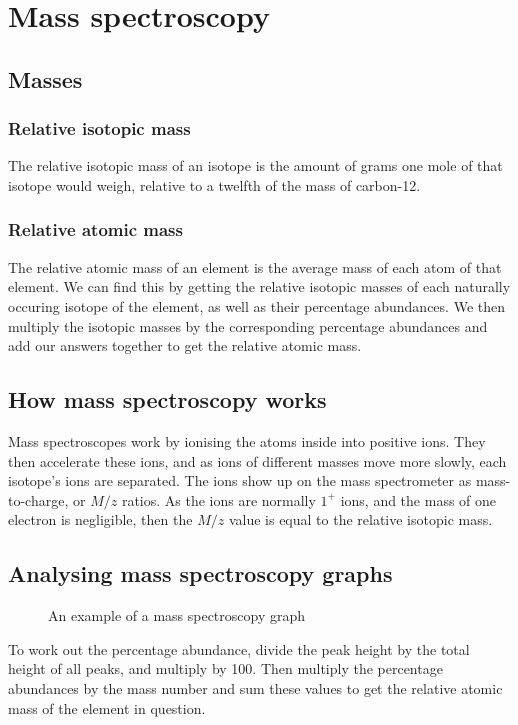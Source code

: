 \section{Mass spectroscopy}
\subsection{Masses}
\subsubsection{Relative isotopic mass}
The relative isotopic mass of an isotope is the amount of grams one mole of that isotope would weigh, relative to a twelfth of the mass of carbon-12.
\subsubsection{Relative atomic mass}
The relative atomic mass of an element is the average mass of each atom of that element. We can find this by getting the relative isotopic masses of each naturally occuring isotope of the element, as well as their percentage abundances. We then multiply the isotopic masses by the corresponding percentage abundances and add our answers together to get the relative atomic mass.

\subsection{How mass spectroscopy works}
Mass spectroscopes work by ionising the atoms inside into positive ions. They then accelerate these ions, and as ions of different masses move more slowly, each isotope's ions are separated. The ions show up on the mass spectrometer as mass-to-charge, or $M/z$ ratios. As the ions are normally $1^+$ ions, and the mass of one electron is negligible, then the $M/z$ value is equal to the relative isotopic mass.

\subsection{Analysing mass spectroscopy graphs}
\begin{figure}[ht]
    \centering
    \caption{An example of a mass spectroscopy graph}
    \label{fig:an-example-of-a-mass-spectroscopy-graph}
\end{figure}
To work out the percentage abundance, divide the peak height by the total height of all peaks, and multiply by 100. Then multiply the percentage abundances by the mass number and sum these values to get the relative atomic mass of the element in question.
